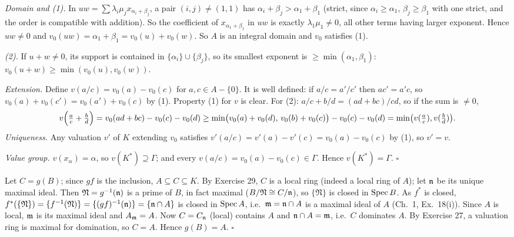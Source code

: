 \documentclass[11pt]{article}
\begin{document}
\emph{Domain and (1).} In $uw=\sum\lambda_i\mu_jx_{\alpha_i+\beta_j}$, a pair $(i,j)\ne(1,1)$ has $\alpha_i+\beta_j>\alpha_1+\beta_1$ (strict, since $\alpha_i\ge\alpha_1$, $\beta_j\ge\beta_1$ with one strict, and the order is compatible with addition). So the coefficient of $x_{\alpha_1+\beta_1}$ in $uw$ is exactly $\lambda_1\mu_1\ne0$, all other terms having larger exponent. Hence $uw\ne0$ and $v_0(uw)=\alpha_1+\beta_1=v_0(u)+v_0(w)$. So $A$ is an integral domain and $v_0$ satisfies (1).

\emph{(2).} If $u+w\ne0$, its support is contained in $\{\alpha_i\}\cup\{\beta_j\}$, so its smallest exponent is $\ge\min(\alpha_1,\beta_1)$: $v_0(u+w)\ge\min(v_0(u),v_0(w))$.

\emph{Extension.} Define $v(a/c)=v_0(a)-v_0(c)$ for $a,c\in A-\{0\}$. It is well defined: if $a/c=a'/c'$ then $ac'=a'c$, so $v_0(a)+v_0(c')=v_0(a')+v_0(c)$ by (1). Property (1) for $v$ is clear. For (2): $a/c+b/d=(ad+bc)/cd$, so if the sum is $\ne0$,
\[
v\Bigl(\tfrac ac+\tfrac bd\Bigr)=v_0(ad+bc)-v_0(c)-v_0(d)\ge\min\bigl(v_0(a)+v_0(d),\,v_0(b)+v_0(c)\bigr)-v_0(c)-v_0(d)=\min\bigl(v(\tfrac ac),v(\tfrac bd)\bigr).
\]
\emph{Uniqueness.} Any valuation $v'$ of $K$ extending $v_0$ satisfies $v'(a/c)=v'(a)-v'(c)=v_0(a)-v_0(c)$ by (1), so $v'=v$.

\emph{Value group.} $v(x_\alpha)=\alpha$, so $v(K^*)\supseteq\Gamma$; and every $v(a/c)=v_0(a)-v_0(c)\in\Gamma$. Hence $v(K^*)=\Gamma$. \hfill$\square$

\pf
Let $C=g(B)$; since $gf$ is the inclusion, $A\subseteq C\subseteq K$. By Exercise 29, $C$ is a local ring (indeed a local ring of $A$); let $\mathfrak n$ be its unique maximal ideal. Then $\mathfrak N=g^{-1}(\mathfrak n)$ is a prime of $B$, in fact maximal ($B/\mathfrak N\cong C/\mathfrak n$), so $\{\mathfrak N\}$ is closed in $\operatorname{Spec} B$. As $f^*$ is closed, $f^*(\{\mathfrak N\})=\{f^{-1}(\mathfrak N)\}=\{(gf)^{-1}(\mathfrak n)\}=\{\mathfrak n\cap A\}$ is closed in $\operatorname{Spec} A$, i.e.\ $\mathfrak m=\mathfrak n\cap A$ is a maximal ideal of $A$ (Ch.~1, Ex.~18(i)). Since $A$ is local, $\mathfrak m$ is its maximal ideal and $A_\mathfrak m=A$. Now $C=C_\mathfrak n$ (local) contains $A$ and $\mathfrak n\cap A=\mathfrak m$, i.e.\ $C$ dominates $A$. By Exercise 27, a valuation ring is maximal for domination, so $C=A$. Hence $g(B)=A$. \hfill$\square$
\end{document}
